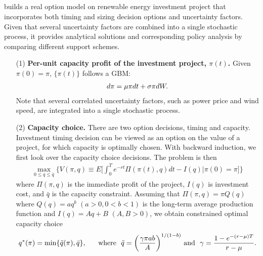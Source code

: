 \documentclass[11pt,letter]{article}
\theoremstyle{definition}
\theoremstyle{remark}
\numberwithin{equation}{section}
\begin{document}
\subsection{\cite{kitzing2017real}}
\cite{kitzing2017real} builds a real option model on renewable energy investment project that incorporates both timing and sizing decision options and uncertainty factors. Given that several uncertainty factors are combined into a single stochastic process, it provides analytical solutions and corresponding policy analysis by comparing different support schemes.
\begin{itemize}
    \item[(1)] \textbf{Per-unit capacity profit of the investment project, $\pi(t)$.} Given $\pi(0)=\pi$, $\{\pi(t)\}$ follows a GBM:
    \begin{align*}
        d\pi=\mu\pi dt+\sigma\pi dW.
    \end{align*}
    Note that several correlated uncertainty factors, such as power price and wind speed, are integrated into a single stochastic process.
    
    \item[(2)] \textbf{Capacity choice.} There are two option decisions, timing and capacity. Investment timing decision can be viewed as an option on the value of a project, for which capacity is optimally chosen. With backward induction, we first look over the capacity choice decisions. The problem is then
    \begin{align*}
        \max_{0\le q\le\bar{q}}\bigg\{V(\pi,q)\equiv E\bigg[\int_0^Te^{-rt}\Pi(\pi(t),q)dt-I(q)\bigg|\pi(0)=\pi\bigg]\bigg\}
    \end{align*}
    where $\Pi(\pi,q)$ is the immediate profit of the project, $I(q)$ is investment cost, and $\bar{q}$ is the capacity constraint. Assuming that $\Pi(\pi,q)=\pi Q(q)$ where $Q(q)=aq^b$ $(a>0,0<b<1)$ is the long-term average production function and $I(q)=Aq+B$ $(A,B>0)$, we obtain constrained optimal capacity choice
    \begin{align*}
        q^*(\pi)=\min\{\tilde{q}(\pi),\bar{q}\},~~~~~\text{where}~~\tilde{q}=\bigg(\frac{\gamma\pi ab}{A}\bigg)^{1/(1-b)}~\text{and}~~\gamma=\frac{1-e^{-(r-\mu)T}}{r-\mu}.
    \end{align*}
    

\end{itemize}
\end{document}

